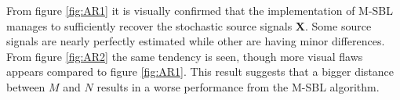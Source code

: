 \noindent
From figure \ref{fig:AR1} it is visually confirmed that the implementation of M-SBL manages to sufficiently recover the stochastic source signals $\mathbf{X}$. 
Some source signals are nearly perfectly estimated while other are having minor differences. 
From figure \ref{fig:AR2} the same tendency is seen, though more visual flaws appears compared to figure \ref{fig:AR1}. 
This result suggests that a bigger distance between $M$ and $N$ results in a worse performance from the M-SBL algorithm.        

% 






 
